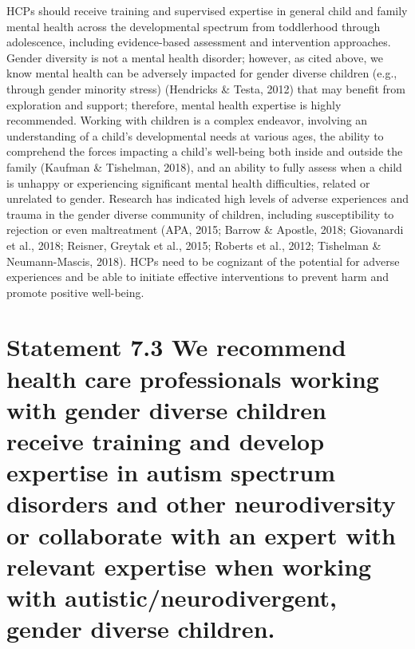 \documentclass[
]{book}
\begin{document}
HCPs should receive training and supervised
expertise in general child and family mental
health across the developmental spectrum from
toddlerhood through adolescence, including
evidence-based assessment and intervention
approaches. Gender diversity is not a mental
health disorder; however, as cited above, we know
mental health can be adversely impacted for gender diverse children (e.g., through gender minority
stress) (Hendricks \& Testa, 2012) that may benefit
from exploration and support; therefore, mental
health expertise is highly recommended. Working
with children is a complex endeavor, involving
an understanding of a child's developmental needs
at various ages, the ability to comprehend the
forces impacting a child's well-being both inside
and outside the family (Kaufman \& Tishelman,
2018), and an ability to fully assess when a child
is unhappy or experiencing significant mental
health difficulties, related or unrelated to gender.
Research has indicated high levels of adverse
experiences and trauma in the gender diverse
community of children, including susceptibility
to rejection or even maltreatment (APA, 2015;
Barrow \& Apostle, 2018; Giovanardi et al., 2018;
Reisner, Greytak et al., 2015; Roberts et al., 2012;
Tishelman \& Neumann-Mascis, 2018). HCPs need
to be cognizant of the potential for adverse experiences and be able to initiate effective interventions to prevent harm and promote positive
well-being.

\hypertarget{statement-7.3-we-recommend-health-care-professionals-working-with-gender-diverse-children-receive-training-and-develop-expertise-in-autism-spectrum-disorders-and-other-neurodiversity-or-collaborate-with-an-expert-with-relevant-expertise-when-working-with-autisticneurodivergent-gender-diverse-children.}{%
\section*{Statement 7.3 We recommend health care professionals working with gender diverse children receive training and develop expertise in autism spectrum disorders and other neurodiversity or collaborate with an expert with relevant expertise when working with autistic/neurodivergent, gender diverse children.}\label{statement-7.3-we-recommend-health-care-professionals-working-with-gender-diverse-children-receive-training-and-develop-expertise-in-autism-spectrum-disorders-and-other-neurodiversity-or-collaborate-with-an-expert-with-relevant-expertise-when-working-with-autisticneurodivergent-gender-diverse-children.}}
\end{document}
